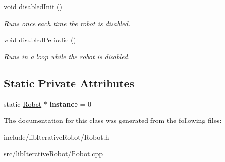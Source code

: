 \begin{DoxyCompactItemize}
\mbox{\label{class_robot_a34f8bfa41ab64deae701c5583f619e78}} 
void \mbox{\hyperlink{class_robot_a34f8bfa41ab64deae701c5583f619e78}{disabled\+Init}} ()
\begin{DoxyCompactList}\small\item\em Runs once each time the robot is disabled. \end{DoxyCompactList}\item 
\mbox{\label{class_robot_a9d35b3c9b4de467c7435d0cc6f17b33b}} 
void \mbox{\hyperlink{class_robot_a9d35b3c9b4de467c7435d0cc6f17b33b}{disabled\+Periodic}} ()
\begin{DoxyCompactList}\small\item\em Runs in a loop while the robot is disabled. \end{DoxyCompactList}\end{DoxyCompactItemize}
\subsection*{Static Private Attributes}
\begin{DoxyCompactItemize}
\item 
\mbox{\label{class_robot_aad5c5d6db601aac62393d47ec9385fa3}} 
static \mbox{\hyperlink{class_robot}{Robot}} $\ast$ {\bfseries instance} = 0
\end{DoxyCompactItemize}


The documentation for this class was generated from the following files\+:\begin{DoxyCompactItemize}
\item 
include/lib\+Iterative\+Robot/Robot.\+h\item 
src/lib\+Iterative\+Robot/Robot.\+cpp\end{DoxyCompactItemize}

